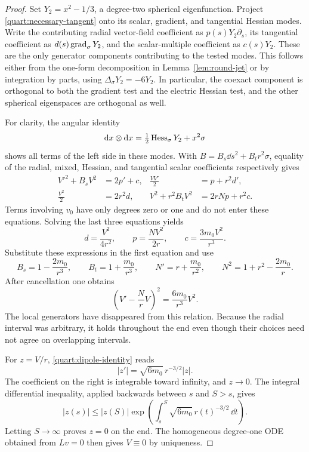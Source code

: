 \begin{proof}
Set \(Y_2=x^2-1/3\), a degree-two spherical eigenfunction.  Project
\eqref{quart:necessary-tangent} onto its scalar, gradient, and
tangential Hessian modes.  Write the contributing radial vector-field
coefficient as \(p(s)Y_2\partial_s\), its tangential coefficient as
\(d(s)\operatorname{grad}_\sigma Y_2\), and the scalar-multiple coefficient as
\(c(s)Y_2\).  These are the only generator components contributing to
the tested modes.  This follows either from the one-form decomposition
in Lemma~\ref{lem:round-jet} or by integration by parts, using
\(\Delta_\sigma Y_2=-6Y_2\).  In particular, the coexact component
is orthogonal to both the gradient test and the electric Hessian
test, and the other spherical eigenspaces are orthogonal as well.

For clarity, the angular identity
\[
 \mathrm{d} x\otimes\mathrm{d} x
       =\tfrac12\operatorname{Hess}_\sigma Y_2+x^2\sigma
\]
shows all terms of the left side in these modes.  With
\(B=B_s\dd s^2+B_t r^2\sigma\), equality of the radial, mixed,
Hessian, and tangential scalar coefficients respectively gives
\begin{align}
 V'^2+B_sV^2&=2p'+c,
 &\frac{VV'}2&=p+r^2d',\nonumber\\
 \frac{V^2}2&=2r^2d,
 &V^2+r^2B_tV^2&=2rNp+r^2c.
 \label{quart:projection-system}
\end{align}
Terms involving \(v_0\) have only degrees zero or one and do not
enter these equations.  Solving the last three equations yields
\[
 d=\frac{V^2}{4r^2},\qquad
 p=\frac{NV^2}{2r},\qquad
 c=\frac{3m_0V^2}{r^3}.
\]
Substitute these expressions in the first equation and use
\[
 B_s=1-\frac{2m_0}{r^3},\qquad
 B_t=1+\frac{m_0}{r^3},\qquad
 N'=r+\frac{m_0}{r^2},\qquad
 N^2=1+r^2-\frac{2m_0}{r}.
\]
After cancellation one obtains
\begin{equation}
 \left(V'-\frac NrV\right)^2
       =\frac{6m_0}{r^3}V^2.
 \label{quart:dipole-identity}
\end{equation}
The local generators have disappeared from this relation.  Because
the radial interval was arbitrary, it holds throughout the end even
though their choices need not agree on overlapping intervals.

For \(z=V/r\), \eqref{quart:dipole-identity} reads
\[
 |z'|=\sqrt{6m_0}\,r^{-3/2}|z|.
\]
The coefficient on the right is integrable toward infinity, and
\(z\to0\).  The integral differential inequality, applied backwards
between \(s\) and \(S>s\), gives
\[
 |z(s)|\leq |z(S)|
       \exp\left(\int_s^S\sqrt{6m_0}\,r(t)^{-3/2}\,\dd t\right).
\]
Letting \(S\to\infty\) proves \(z=0\) on the end.  The homogeneous
degree-one ODE obtained from \(Lv=0\) then gives \(V\equiv0\) by
uniqueness.
\end{proof}

